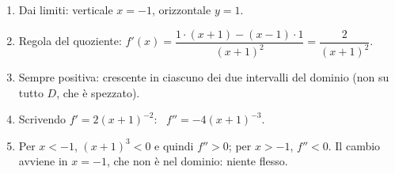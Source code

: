 \begin{question}[ID=2.2, subtitle={Studio completo di una funzione razionale}, difficulty=media, tags={funzioni, studio di funzione, funzioni razionali}]
\begin{explanation}
\begin{enumerate}
    \item Dai limiti: verticale $x=-1$, orizzontale $y=1$.
    \item Regola del quoziente: $f'(x)=\dfrac{1\cdot(x+1)-(x-1)\cdot1}{(x+1)^2}=\dfrac{2}{(x+1)^2}$.
    \item Sempre positiva: crescente in ciascuno dei due intervalli del dominio (non su tutto $D$, che è spezzato).
    \item Scrivendo $f'=2(x+1)^{-2}$: \ $f''=-4(x+1)^{-3}$.
    \item Per $x<-1$, $(x+1)^3<0$ e quindi $f''>0$; per $x>-1$, $f''<0$. Il cambio avviene in $x=-1$, che non è nel dominio: niente flesso.
\end{enumerate}
\end{explanation}
\end{question}



